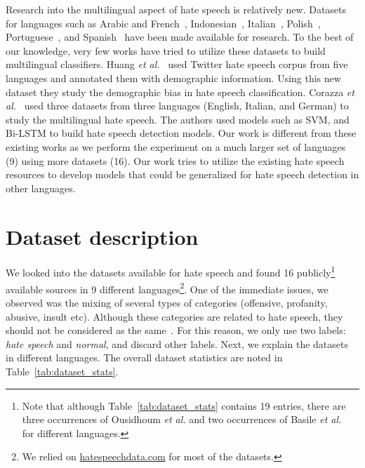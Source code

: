 \documentclass[runningheads]{llncs}
\begin{document}
Research into the multilingual aspect of hate speech is relatively new. Datasets for languages such as Arabic and French~\cite{ousidhoum2019multilingual}, Indonesian~\cite{ibrohim2019multi}, Italian~\cite{sanguinetti2018italian}, Polish~\cite{ptaszynski2019results}, Portuguese~\cite{fortuna2019hierarchically}, and Spanish~\cite{basile2019semeval} have been made available for research. To the best of our knowledge, very few works have tried to utilize these datasets to build multilingual classifiers. Huang \textit{et al.}~\cite{huang2020multilingual} used Twitter hate speech corpus from five languages and annotated them with demographic information. Using this new dataset they study the demographic bias in hate speech classification. Corazza \textit{et al.}~\cite{corazza2020multilingual} used three datasets from three languages (English, Italian, and German) to study the multilingual hate speech. The authors used models such as SVM, and Bi-LSTM to build hate speech detection models. Our work is different from these existing works as we perform the experiment on a much larger set of languages (9) using more datasets (16). Our work tries to utilize the existing hate speech resources to develop models that could be generalized for hate speech detection in other languages. 





\section{Dataset description}\label{sec:dataset}

We looked into the datasets available for hate speech and found 16 publicly\footnote{Note that although Table~\ref{tab:dataset_stats} contains 19 entries, there are three occurrences of Ousidhoum \textit{et al.} \cite{ousidhoum2019multilingual} and two occurrences of Basile \textit{et al.}~\cite{basile2019semeval} for different languages.} available sources in 9 different languages\footnote{We relied on \url{hatespeechdata.com} for most of the datasets.}. One of the immediate issues, we observed was the mixing of several types of categories (offensive, profanity, abusive, insult etc). Although these categories are related to hate speech, they should not be considered as the same~\cite{davidson2017automated}. For this reason, we only use two labels: \textit{hate speech} and \textit{normal}, and discard other labels. Next, we explain the datasets in different languages. The overall dataset statistics are noted in Table~\ref{tab:dataset_stats}.
\end{document}
